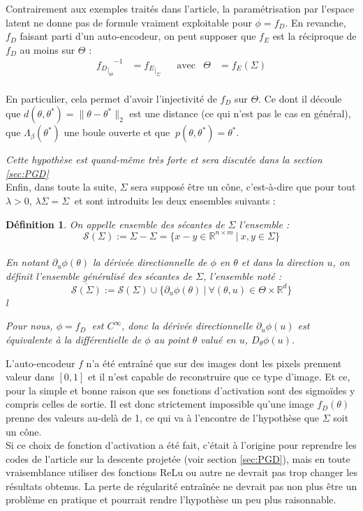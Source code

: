 \documentclass[hidelinks, french]{article} %
\newcommand{\R}{\mathbb{R}}
\theoremstyle{enonce}
\newtheorem{definition}{Définition}
\theoremstyle{special}
\theoremstyle{rq}
\theoremstyle{exo}
\theoremstyle{demo}
\begin{document}
Contrairement aux exemples traités dans l'article, la paramétrisation par l'espace latent ne donne pas de formule vraiment exploitable pour $\phi=f_D$. En revanche, $f_D$ faisant parti d'un auto-encodeur, on peut supposer que $f_E$ est la réciproque de $f_D$ au moins sur $\Theta$ :
\begin{align*} {{f_{D}}_{\displaystyle |_{\Theta}}}^{-1}&={f_{E}}_{\displaystyle |_{\Sigma}}  & &\text{avec} & \Theta&=f_E(\Sigma)
\end{align*}
\\
En particulier, cela permet d'avoir l'injectivité de $f_D$ sur $\Theta$. Ce dont il découle que $d(\theta,\theta^*)=\|\theta-\theta^*\|_2$ est une distance (ce qui n'est pas le cas en général), que $\Lambda_\beta(\theta^*)$ une boule ouverte et que $\ p(\theta,\theta^*)=\theta^*$.

\emph{Cette hypothèse est quand-même très forte et sera discutée dans la section \ref{sec:PGD}}
\\

Enfin, dans toute la suite, $\Sigma$ sera supposé être un cône, c'est-à-dire que pour tout $\lambda>0$, $\lambda\Sigma=\Sigma\ $ et sont introduits les deux ensembles suivants :
\\

\begin{definition} On appelle \emph{ensemble des sécantes de $\Sigma$} l'ensemble :
	\[\mathcal{S}(\Sigma) := \Sigma-\Sigma = \big\{x-y\in\R^{n\times m}\ |\ x,y\in\Sigma\big\}\]
	\\
	En notant $\partial_u\phi(\theta)$ la dérivée directionnelle de $\phi$ en $\theta$ et dans la direction $u$, on définit l'\emph{ensemble généralisé des sécantes de $\Sigma$}, l'ensemble noté :
	\[\overline{\mathcal{S}(\Sigma)}:=\mathcal{S}(\Sigma)\cup\Big\{\partial_u\phi(\theta)\ |\ \forall (\theta,u)\in\Theta\times\R^d\Big\}\]{\color{white}l}
	
	\emph{Pour nous, $\phi=f_D\ $ est $C^\infty$, donc la dérivée directionnelle $\partial_u\phi(u)$ est équivalente à la différentielle de $\phi$ au point $\theta$ valué en $u$, $D_\theta\phi(u)$.}
\end{definition}

L'auto-encodeur $f$ n'a été entraîné que sur des images dont les pixels prennent valeur dans $[0,1]$ et il n'est capable de reconstruire que ce type d'image. Et ce, pour la simple et bonne raison que ses fonctions d'activation sont des sigmoïdes y compris celles de sortie. Il est donc strictement impossible qu'une image $f_D(\theta)$ prenne des valeurs au-delà de 1, ce qui va à l'encontre de l'hypothèse que $\Sigma$ soit un cône.
\\
Si ce choix de fonction d'activation a été fait, c'était à l'origine pour reprendre les codes de l'article \cite{peng_solving_2019} sur la descente projetée (voir section \ref{sec:PGD}), mais en toute vraisemblance utiliser des fonctions ReLu ou autre ne devrait pas trop changer les résultats obtenus.
La perte de régularité entraînée ne devrait pas non plus être un problème en pratique et pourrait rendre l'hypothèse un peu plus raisonnable.
\\
\end{document}
